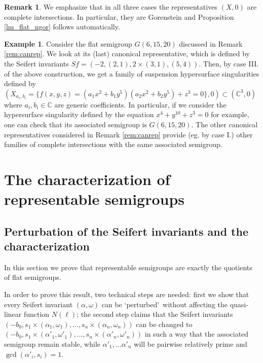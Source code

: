 \documentclass[oneside]{amsart}
\numberwithin{equation}{section}
\numberwithin{equation}{subsection}
\theoremstyle{plain}
\theoremstyle{definition}
\newtheorem{example}[equation]{Example}
\newtheorem{remark}[equation]{Remark}
\def\C{\mathbb C}
\newcommand{\w}{\omega}
\newcommand{\al}{\alpha}
\begin{document}
\begin{remark}
We emphasize that in all three cases the representatives $(X,0)$ are complete intersections. In particular, they are Gorenstein and Proposition \ref{lm_flat_ngor} follows automatically.  
\end{remark}


\begin{example} 
Consider the flat semigroup $G(6,15,20)$ discussed in Remark \ref{rem:canrep}. We look at its (last) canonical representative, which is defined by the Seifert invariants $Sf=(-2,(2,1), 2\times (3,1), (5,4))$. Then, by case III. of the above construction, we get a family of suspension hypersurface singularities defined by $(X_{a_i,b_i}=\{f(x,y,z)=(a_1x^2+b_1y^5)(a_2x^2+b_2y^5)+z^3=0\},0)\subset (\mathbb{C}^3,0)$ where $a_i,b_i\in \C$ are generic coefficients. In particular, if we consider the hypersurface singularity defined by the equation $x^4+y^{10}+z^3=0$ for example, one can check that its associated semigroup is $G(6,15,20)$. The other canonical representatives considered in Remark \ref{rem:canrep} provide (eg. by case I.) other families of complete intersections with the same associated semigroup.    
\end{example}






\section{The characterization of representable semigroups} \label{s:ch}

\subsection{Perturbation of the Seifert invariants and the characterization}

In this section we prove that representable semigroups are exactly the  quotients of  flat semigroups. 

In order to prove this result, two technical steps are needed: first we show that every Seifert invariant $(\al,\w)$ can be 
\textquoteleft perturbed\textquoteright\ without affecting the quasi-linear function $N(\ell)$; the  second step claims that the Seifert invariants $(-b_0,s_1\times(\al_1,\w_1),\dots,s_{n}\times(\al_{n},\w_{n}))$ can be changed to  $(-b_0,s_1\times(\al'_1,\w'_1),\dots,s_{n}\times(\al'_{n},\w'_{n}))$ in such a way that the associated semigroup remain stable, while $\al'_1,\dots\al'_n$ will be pairwise relatively prime and $\gcd(\al'_i,s_{i})=1$.
\end{document}

